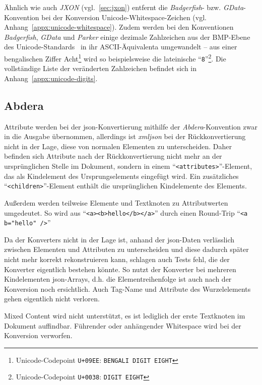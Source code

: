 Ähnlich wie auch \emph{JXON} (vgl.~\ref{sec:jxon}) entfernt die \emph{Badgerfish}- bzw. \emph{GData}-Konvention bei der Konversion Unicode-Whitespace-Zeichen (vgl. Anhang~\ref{appx:unicode-whitespace}). Zudem werden bei den Konventionen \emph{Badgerfish}, \emph{GData} und \emph{Parker} einige dezimale Zahlzeichen aus der BMP-Ebene des Unicode-Standards~\cite[S.~49]{unicode9} in ihr ASCII-Äquivalenta umgewandelt -- aus einer bengalischen Ziffer Acht\footnote{Unicode-Codepoint \texttt{U+09EE}: \texttt{BENGALI DIGIT EIGHT}} wird so beispielsweise die lateinische \enquote{\texttt{8}}\footnote{Unicode-Codepoint \texttt{U+0038}: \texttt{DIGIT EIGHT}}. Die vollständige Liste der veränderten Zahlzeichen befindet sich in Anhang~\ref{appx:unicode-digits}.

\subsection{Abdera}
\label{sec:xmljson-abdera}

Attribute werden bei der \acrshort{json}-Konvertierung mithilfe der \emph{Abdera}-Konvention zwar in die Ausgabe übernommen, allerdings ist \emph{xmljson} bei der Rückkonvertierung nicht in der Lage, diese von normalen Elementen zu unterscheiden. Daher befinden sich Attribute nach der Rückkonvertierung nicht mehr an der ursprünglichen Stelle im Dokument, sondern in einem \enquote{\texttt{<attributes>}}-Element, das als Kindelement des Ursprungselements eingefügt wird. Ein zusätzliches \enquote{\texttt{<children>}}-Element enthält die ursprünglichen Kindelemente des Elements.

Außerdem werden teilweise Elemente und Textknoten zu Attributwerten umgedeutet. So wird aus \enquote{\texttt{<a><b>hello</b></a>}} durch einen Round-Trip \enquote{\texttt{<a b="hello" />}}

Da der Konverters nicht in der Lage ist, anhand der \acrshort{json}-Daten verlässlich zwischen Elementen und Attributen zu unterscheiden und diese dadurch später nicht mehr korrekt rekonstruieren kann, schlagen auch Tests fehl, die der Konverter eigentlich bestehen könnte. So nutzt der Konverter bei mehreren Kindelementen \acrshort{json}-Arrays, d.h. die Elementreihenfolge ist auch nach der Konversion noch ersichtlich.
Auch Tag-Name und Attribute des Wurzelelements gehen eigentlich nicht verloren.

Mixed Content wird nicht unterstützt, es ist lediglich der erste Textknoten im Dokument auffindbar.
Führender oder anhängender Whitespace wird bei der Konversion verworfen.

